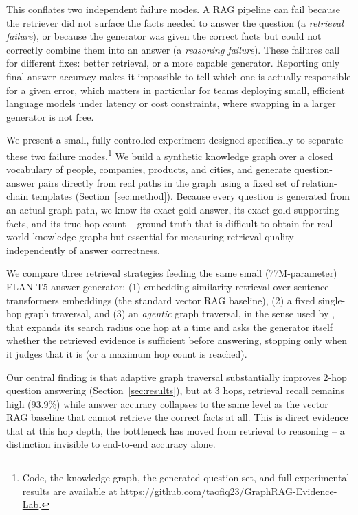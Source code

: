 \documentclass[11pt]{article}
\begin{document}
This conflates two independent failure modes. A RAG pipeline can fail because the retriever did not surface the facts needed to answer the question (a \emph{retrieval failure}), or because the generator was given the correct facts but could not correctly combine them into an answer (a \emph{reasoning failure}). These failures call for different fixes: better retrieval, or a more capable generator. Reporting only final answer accuracy makes it impossible to tell which one is actually responsible for a given error, which matters in particular for teams deploying small, efficient language models under latency or cost constraints, where swapping in a larger generator is not free.

We present a small, fully controlled experiment designed specifically to separate these two failure modes.\footnote{Code, the knowledge graph, the generated question set, and full experimental results are available at \url{https://github.com/taofiq23/GraphRAG-Evidence-Lab}.} We build a synthetic knowledge graph over a closed vocabulary of people, companies, products, and cities, and generate question-answer pairs directly from real paths in the graph using a fixed set of relation-chain templates (Section~\ref{sec:method}). Because every question is generated from an actual graph path, we know its exact gold answer, its exact gold supporting facts, and its true hop count -- ground truth that is difficult to obtain for real-world knowledge graphs but essential for measuring retrieval quality independently of answer correctness.

We compare three retrieval strategies feeding the same small (77M-parameter) FLAN-T5 \citep{chung2022flant5} answer generator: (1) embedding-similarity retrieval over sentence-transformers embeddings \citep{reimers2019sbert} (the standard vector RAG baseline), (2) a fixed single-hop graph traversal, and (3) an \emph{agentic} graph traversal, in the sense used by \citet{yao2023react}, that expands its search radius one hop at a time and asks the generator itself whether the retrieved evidence is sufficient before answering, stopping only when it judges that it is (or a maximum hop count is reached).

Our central finding is that adaptive graph traversal substantially improves 2-hop question answering (Section~\ref{sec:results}), but at 3 hops, retrieval recall remains high (93.9\%) while answer accuracy collapses to the same level as the vector RAG baseline that cannot retrieve the correct facts at all. This is direct evidence that at this hop depth, the bottleneck has moved from retrieval to reasoning -- a distinction invisible to end-to-end accuracy alone.
\end{document}
